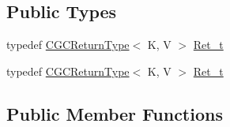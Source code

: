 \subsection*{Public Types}
\begin{DoxyCompactItemize}
\item 
typedef \mbox{\hyperlink{structHadron_1_1CGCReturnType}{C\+G\+C\+Return\+Type}}$<$ K, V $>$ \mbox{\hyperlink{classHadron_1_1CGCMapObject_a154c1c2b41f7dad9d5692b4d2c6f5a2c}{Ret\+\_\+t}}
\item 
typedef \mbox{\hyperlink{structHadron_1_1CGCReturnType}{C\+G\+C\+Return\+Type}}$<$ K, V $>$ \mbox{\hyperlink{classHadron_1_1CGCMapObject_a154c1c2b41f7dad9d5692b4d2c6f5a2c}{Ret\+\_\+t}}
\end{DoxyCompactItemize}
\subsection*{Public Member Functions}
